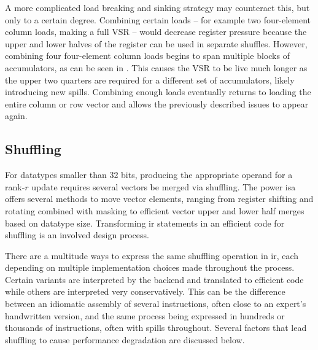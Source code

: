 \documentclass[\main/thesis.tex]{subfiles}
\begin{document}
A more complicated load breaking and sinking strategy may counteract this, but only to a certain degree.
Combining certain loads -- for example two four-element  column loads, making a full VSR -- would decrease register pressure because the upper and lower halves of the register can be used in separate shuffles.
However, combining four four-element  column loads begins to span multiple blocks of accumulators, as can be seen in .
This causes the VSR to be \gls{live} much longer as the upper two quarters are required for a different set of accumulators, likely introducing new spills.
Combining enough loads eventually returns to loading the entire column or row vector and allows the previously described issues to appear again.

\subsection{Shuffling}
For datatypes smaller than 32 bits, producing the appropriate operand for a rank-$r$ update requires several vectors be merged via shuffling.
The \gls{power} \gls{isa} offers several methods to move vector elements, ranging from register shifting and rotating combined with masking to efficient vector upper and lower half merges based on datatype size.
Transforming \gls{ir} statements in an efficient code for shuffling is an involved design process.

There are a multitude ways to express the same shuffling operation in \gls{ir}, each depending on multiple implementation choices made throughout the process.
Certain variants are interpreted by the backend and translated to efficient code while others are interpreted very conservatively.
This can be the difference between an idiomatic assembly of several instructions, often close to an expert's handwritten version, and the same process being expressed in hundreds or thousands of instructions, often with \glspl{spill} throughout.
Several factors that lead shuffling to cause performance degradation are discussed below.
\end{document}
